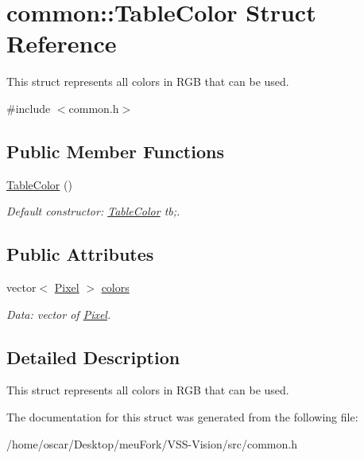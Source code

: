 \hypertarget{structcommon_1_1TableColor}{\section{common\-:\-:Table\-Color Struct Reference}
\label{structcommon_1_1TableColor}
}


This struct represents all colors in R\-G\-B that can be used.  




{\ttfamily \#include $<$common.\-h$>$}

\subsection*{Public Member Functions}
\begin{DoxyCompactItemize}
\item 
\hypertarget{structcommon_1_1TableColor_a08d8a7adc0b6462e2f78843dfd2e9b49}{\hyperlink{structcommon_1_1TableColor_a08d8a7adc0b6462e2f78843dfd2e9b49}{Table\-Color} ()}\label{structcommon_1_1TableColor_a08d8a7adc0b6462e2f78843dfd2e9b49}

\begin{DoxyCompactList}\small\item\em Default constructor\-: \hyperlink{structcommon_1_1TableColor}{Table\-Color} tb;. \end{DoxyCompactList}\end{DoxyCompactItemize}
\subsection*{Public Attributes}
\begin{DoxyCompactItemize}
\item 
\hypertarget{structcommon_1_1TableColor_a8ce253b484c9054445fcd4b3adc4726d}{vector$<$ \hyperlink{structcommon_1_1Pixel}{Pixel} $>$ \hyperlink{structcommon_1_1TableColor_a8ce253b484c9054445fcd4b3adc4726d}{colors}}\label{structcommon_1_1TableColor_a8ce253b484c9054445fcd4b3adc4726d}

\begin{DoxyCompactList}\small\item\em Data\-: vector of \hyperlink{structcommon_1_1Pixel}{Pixel}. \end{DoxyCompactList}\end{DoxyCompactItemize}


\subsection{Detailed Description}
This struct represents all colors in R\-G\-B that can be used. 

The documentation for this struct was generated from the following file\-:\begin{DoxyCompactItemize}
\item 
/home/oscar/\-Desktop/meu\-Fork/\-V\-S\-S-\/\-Vision/src/common.\-h\end{DoxyCompactItemize}
